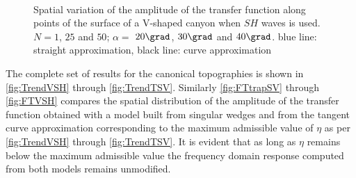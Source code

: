 \documentclass[11pt,letterpaper]{article}
\begin{document}
\begin{figure}[H]
	 \\
	\caption{Spatial variation of the amplitude of the transfer function along points of the surface of a V-shaped canyon when $SH$ waves is used. $N =1$, $25$ and  $50$; $\alpha=$ $20 \grad$, $30 \grad$ and $40 \grad$. blue line: straight approximation, black line: curve approximation}
	\label{fig:FTVSHadd}
\end{figure}



The complete set of results for the canonical topographies is shown in \cref{fig:TrendVSH} through \cref{fig:TrendTSV}. Similarly \cref{fig:FTtrapSV} through \cref{fig:FTVSH} compares the spatial distribution of the amplitude of the transfer function obtained with a model built from singular wedges and from the tangent curve approximation corresponding to the maximum admissible value of $\eta$ as per \cref{fig:TrendVSH} through \cref{fig:TrendTSV}. It is evident that as long as $\eta$ remains below the maximum admissible value the frequency domain response computed from both models remains unmodified.
\end{document}
